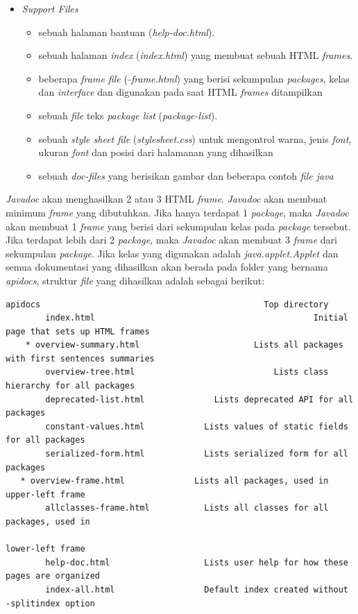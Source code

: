 \documentclass[a4paper,twoside]{article}
\begin{document}
\begin{enumerate}
\begin{enumerate}
\begin{itemize}
	\item {\it Support Files}
	\begin{itemize}
		\item sebuah halaman bantuan ({\it help-doc.html}).
		\item sebuah halaman {\it index} ({\it index.html}) yang membuat sebuah HTML {\it frames}.
		\item beberapa {\it frame file} ({\it *-frame.html}) yang berisi sekumpulan {\it packages}, kelas dan {\it interface} dan digunakan pada saat HTML {\it frames} ditampilkan
		\item sebuah {\it file} teks {\it package list} ({\it package-list}).
		\item sebuah {\it style sheet file} ({\it stylesheet.css}) untuk mengontrol warna, jenis {\it font}, ukuran {\it font} dan posisi dari halamanan yang dihasilkan
		\item sebuah {\it doc-files} yang berisikan gambar dan beberapa contoh {\it file java}
	\end{itemize}
\end{itemize}
{\it Javadoc} akan menghasilkan 2 atau 3 HTML {\it frame}. {\it Javadoc} akan membuat minimum {\it frame} yang dibutuhkan. Jika hanya terdapat 1 {\it package}, maka {\it Javadoc} akan membuat 1 {\it frame} yang berisi dari sekumpulan kelas pada {\it package} tersebut. Jika terdapat lebih dari 2 {\it package}, maka {\it Javadoc} akan membuat 3 {\it frame} dari sekumpulan {\it package}. Jika kelas yang digunakan adalah {\it java.applet.Applet} dan semua dokumentasi yang dihasilkan akan berada pada folder yang bernama {\it apidocs}, struktur {\it file} yang dihasilkan adalah sebagai berikut:
\begin{lstlisting}[caption=Struktur {\it file} yang dihasilkan]
	apidocs						  			  		    Top directory
		index.html											  Initial page that sets up HTML frames
	* overview-summary.html 					  Lists all packages with first sentences summaries
		overview-tree.html							  Lists class hierarchy for all packages
		deprecated-list.html              Lists deprecated API for all packages
   		constant-values.html            Lists values of static fields for all packages
   		serialized-form.html            Lists serialized form for all packages
   * overview-frame.html              Lists all packages, used in upper-left frame
   		allclasses-frame.html           Lists all classes for all packages, used in
   																		lower-left frame
   		help-doc.html                   Lists user help for how these pages are organized
   		index-all.html                  Default index created without -splitindex option

\end{lstlisting}
\end{enumerate}
\end{enumerate}
\end{document}
